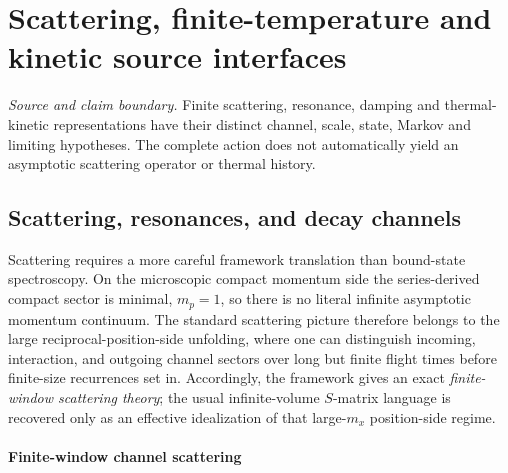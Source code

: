 \documentclass[12pt,a4paper]{article}
\begin{document}


\section{Scattering, finite-temperature and kinetic source interfaces}
\label{p4b:sec:v238-b4}
\noindent\textit{Source and claim boundary.} Finite scattering, resonance, damping and thermal-kinetic representations have their distinct channel, scale, state, Markov and limiting hypotheses. The complete action does not automatically yield an asymptotic scattering operator or thermal history.

\subsection{Scattering, resonances, and decay channels}
\label{p4:sec:part2-scattering}

Scattering requires a more careful framework translation than bound-state spectroscopy.
On the microscopic compact momentum side the series-derived compact sector is minimal, $m_p=1$, so there is no literal infinite asymptotic momentum continuum.
The standard scattering picture therefore belongs to the large reciprocal-position-side unfolding, where one can distinguish incoming, interaction, and outgoing channel sectors over long but finite flight times before finite-size recurrences set in.
Accordingly, the framework gives an exact \emph{finite-window scattering theory}; the usual infinite-volume $S$-matrix language is recovered only as an effective idealization of that large-\(m_x\) position-side regime.



\paragraph{Finite-window channel scattering}
\label{p4:sec:part2-finite-window-scattering}
\end{document}

